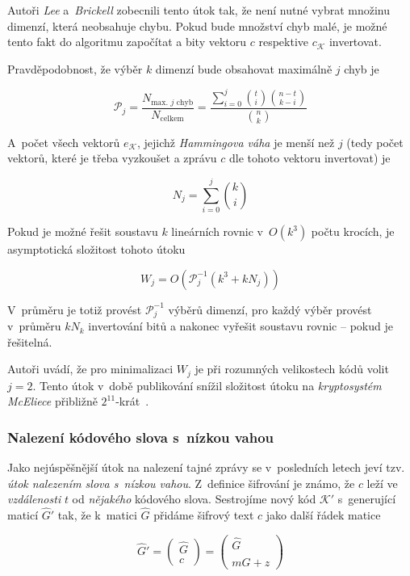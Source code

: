 \documentclass[thesis=M,czech,hidelinks]{FITthesis}[2012/06/26]
\newcommand{\0}{{\textcolor[gray]{0.80}{0}}}
\begin{document}
Autoři \emph{Lee} a~\emph{Brickell} zobecnili tento útok tak, že není nutné
vybrat množinu dimenzí, která neobsahuje chybu. Pokud bude množství chyb malé,
je možné tento fakt do algoritmu započítat a bity vektoru $c$ respektive
$c_{\mathcal{K}}$ invertovat.

Pravděpodobnost, že výběr $k$ dimenzí bude obsahovat maximálně $j$ chyb je

$$
    \mathcal{P}_j= \frac{N_{\text{max. $j$ chyb}}}{N_{\text{celkem}}}
    = \frac{\sum_{i=0}^{j}\binom{t}{i}\binom{n-t}{k-i}}{\binom{n}{k}}
$$

A~počet všech vektorů $e_\mathcal{K}$, jejichž \emph{Hammingova váha} je menší
než $j$ (tedy počet vektorů, které je třeba vyzkoušet a zprávu $c$ dle tohoto
vektoru invertovat) je

$$ N_j = \sum_{i=0}^{j}\binom{k}{i} $$

Pokud je možné řešit soustavu $k$ lineárních rovnic v~$O(k^3)$ počtu krocích, je
asymptotická složitost tohoto útoku

$$ W_j = O\left( \mathcal{P}_{j}^{-1}\left(k^3 + k N_j \right) \right) $$

V~průměru je totiž provést $\mathcal{P}_{j}^{-1}$ výběrů dimenzí, pro každý
výběr provést v~průměru $k N_k$ invertování bitů a nakonec vyřešit soustavu
rovnic -- pokud je řešitelná.

Autoři uvádí, že pro minimalizaci $W_j$ je při rozumných velikostech kódů volit
$j=2$. Tento útok v~době publikování snížil složitost útoku na
\emph{kryptosystém McEliece} přibližně $2^11$-krát~\cite{Lee}.

\subsubsection{Nalezení kódového slova s~nízkou vahou}
Jako nejúspěšnější útok na nalezení tajné zprávy se v~posledních letech jeví
tzv. \emph{útok nalezením slova s~nízkou vahou}. Z~definice šifrování je známo,
že $c$ leží ve \emph{vzdálenosti} $t$ od \emph{nějakého} kódového slova.
Sestrojíme nový kód $\mathcal{K}'$ s~generující maticí $\hat{G}'$ tak, že
k~matici $\hat{G}$ přidáme šifrový text $c$ jako další řádek matice

$$
    \hat{G}' = \left(\begin{array}{c}
        \hat{G} \\
        c
    \end{array}\right) = \left(\begin{array}{c}
        \hat{G} \\
        m\hat{G} + z
    \end{array}\right)
$$
\end{document}
